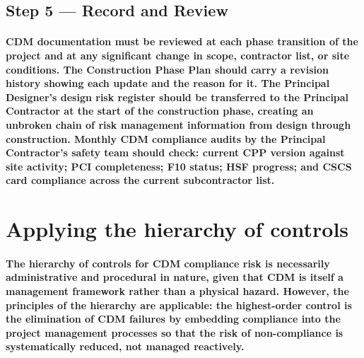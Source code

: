\subsection{Step 5 --- Record and Review}
\paragraph{CDM documentation must be reviewed at each phase transition of the project and at any significant change in scope, contractor list, or site conditions. The Construction Phase Plan should carry a revision history showing each update and the reason for it. The Principal Designer's design risk register should be transferred to the Principal Contractor at the start of the construction phase, creating an unbroken chain of risk management information from design through construction. Monthly CDM compliance audits by the Principal Contractor's safety team should check: current CPP version against site activity; PCI completeness; F10 status; HSF progress; and CSCS card compliance across the current subcontractor list.}


\section{Applying the hierarchy of controls}

\paragraph{The hierarchy of controls for CDM compliance risk is necessarily administrative and procedural in nature, given that CDM is itself a management framework rather than a physical hazard. However, the principles of the hierarchy are applicable: the highest-order control is the elimination of CDM failures by embedding compliance into the project management processes so that the risk of non-compliance is systematically reduced, not managed reactively.}

